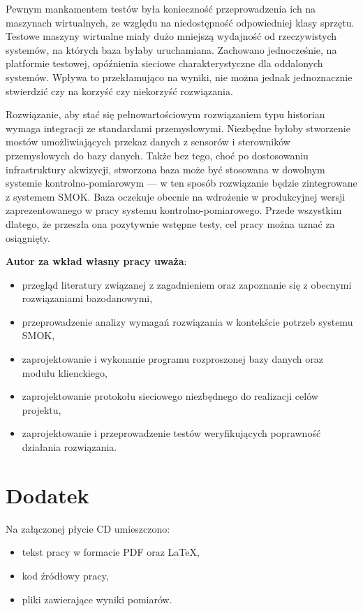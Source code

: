 \documentclass[a4paper,polish,12pt,twoside]{article}
\begin{document}
Pewnym mankamentem testów była konieczność przeprowadzenia ich na maszynach wirtualnych, ze względu na niedostępność odpowiedniej klasy sprzętu. Testowe maszyny wirtualne miały dużo mniejszą wydajność od rzeczywistych systemów, na których baza byłaby uruchamiana. Zachowano jednocześnie, na platformie testowej, opóźnienia sieciowe charakterystyczne dla oddalonych systemów. Wpływa to przekłamująco na wyniki, nie można jednak jednoznacznie stwierdzić czy na korzyść czy niekorzyść rozwiązania. 

Rozwiązanie, aby stać się pełnowartościowym rozwiązaniem typu historian wymaga integracji ze standardami przemysłowymi. Niezbędne byłoby stworzenie mostów umożliwiających przekaz danych z sensorów i sterowników przemysłowych do bazy danych. Także bez tego, choć po dostosowaniu infrastruktury akwizycji, stworzona baza może być stosowana w dowolnym systemie kontrolno-pomiarowym --- w ten sposób rozwiązanie będzie zintegrowane z systemem SMOK. Baza oczekuje obecnie na wdrożenie w produkcyjnej wersji zaprezentowanego w pracy systemu kontrolno-pomiarowego. Przede wszystkim dlatego, że przeszła ona pozytywnie wstępne testy, cel pracy można uznać za osiągnięty.

	\textbf{Autor za wkład własny pracy uważa}:
	\begin{itemize}
		\item przegląd literatury związanej z zagadnieniem oraz zapoznanie się z obecnymi rozwiązaniami bazodanowymi,
		\item przeprowadzenie analizy wymagań rozwiązania w kontekście potrzeb systemu SMOK,
		\item zaprojektowanie i wykonanie programu rozproszonej bazy danych oraz modułu klienckiego,
		\item zaprojektowanie protokołu sieciowego niezbędnego do realizacji celów projektu,
		\item zaprojektowanie i przeprowadzenie testów weryfikujących poprawność działania rozwiązania.
	\end{itemize}
	\clearpage

\listoffigures
\listoftables

\clearpage



\section*{Dodatek}
	Na załączonej płycie CD umieszczono:
	\begin{itemize}
		\item tekst pracy w formacie PDF oraz \LaTeX,
		\item kod źródłowy pracy,
		\item pliki zawierające wyniki pomiarów.
	\end{itemize}
\end{document}

